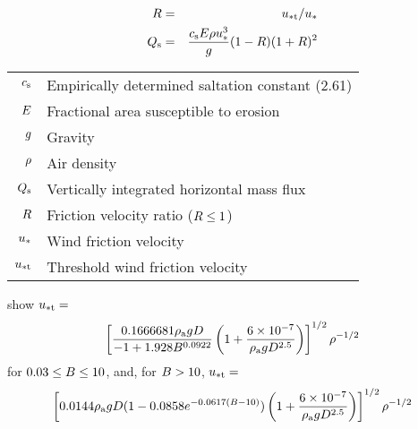\documentclass[final,dvips]{foils}
\begin{document}
\rotatefoilhead{\bgl
\Large\textcolor{blue}{\hfill Saltation Mass Flux $\flxmsshrzslt$\hfill}}\vspace{-1.0in}\large
\begin{eqnarray}
R & = & u_{* \mathrm{t}} / u_{*} \nonumber \\
Q_{\mathrm{s}} & = & { c_{\mathrm{s}} E \rho u_{*}^3 \over g } 
( 1 - R ) ( 1 + R )^2
\label{eqn:flx_mss_hrz_slt_MaB95_1}
\end{eqnarray}
\begin{table}
\begin{tabular}{ >{$}r<{$} l}
\cstslt & Empirically determined saltation constant (2.61) \\[0.0ex]
\sfcfrcslt & Fractional area susceptible to erosion \\[0.0ex]
\grv & Gravity \\[0.0ex]
\dnsatm & Air density \\[0.0ex]
\flxmsshrzslt & Vertically integrated horizontal mass flux \\[0.0ex]
\wndfrcrat & Friction velocity ratio ($\wndfrcrat \le 1$) \\[0.0ex]
\wndfrc & Wind friction velocity \\[0.0ex]
\wndfrcthr & Threshold wind friction velocity \\[0.0ex]
\end{tabular}
\end{table}

\rotatefoilhead{\bgl
\Large\textcolor{blue}{\hfill Threshold Friction Velocity $u_{* \mathrm{t}}$\hfill}}\vspace{-0.5in}\large
\cite{IvW82} show $u_{* \mathrm{t}} = $
\begin{equation}
\left[
{ 0.1666681 \rho_{\mathrm{a}} g D \over -1 + 1.928 B^{0.0922} }
\left( 1 + {6 \times 10^{-7} \over \rho_{\mathrm{a}} g D^{2.5} } \right)
\right]^{1/2}
\rho^{-1/2}
\end{equation}
for $0.03 \le B \le 10$, and, for $B > 10$, $u_{* \mathrm{t}} = $ 
\begin{equation}
\left[
0.0144 \rho_{\mathrm{a}} g D ( 1 - 0.0858 e^{ -0.0617 ( B - 10 ) } ) 
\left( 1 + {6 \times 10^{-7} \over \rho_{\mathrm{a}} g D^{2.5} } \right)
\right]^{1/2}
\rho^{-1/2}
\label{eqn:wnd_frc_thr_obs_2}
\end{equation}
\end{document}
